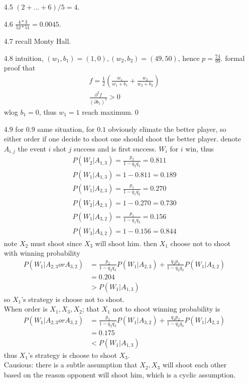 \documentclass[paper=a4, fontsize=11pt]{scrartcl} %
\numberwithin{equation}{section} %
\numberwithin{figure}{section} %
\numberwithin{table}{section} %
\begin{document}
\begin{itemize}
	\item[4.5] $(2+\dots+6)/5= 4$.
	\item[4.6] $\frac{4*3}{52*51}= 0.0045$.
	\item[4.7] recall Monty Hall.
	\item[4.8] intuition, $(w_1,b_1)=(1,0), (w_2,b_2)=(49,50)$, hence $p=\frac{74}{99}$. formal proof that
	\begin{align}
		f = \frac{1}{2}(\frac{w_1}{w_1+b_1} + \frac{w_2}{w_2+b_2})\\
		\frac{\partial^2 f}{(\partial b_1)^2}> 0
	\end{align}
	wlog $b_1=0$, thus $w_1=1$ reach maximum.\qed
	\item[4.9] for $0.9$ same situation, for $0.1$ obviously elimate the better player, so either order if one decide to shoot one should shoot the better player. denote $A_{i,j}$ the event $i$ shot $j$ success and is first success. $W_i$ for $i$ win, thus
	\begin{align}
		P(W_2| A_{1,3}) = \frac{p_2}{1-q_2q_1} = 0.811\\
		P(W_1| A_{1,3}) = 1 -0.811= 0.189\\
		P(W_1| A_{2,3}) = \frac{p_1}{1-q_1q_2} = 0.270\\
		P(W_2| A_{2,3}) = 1 - 0.270 = 0.730\\
		P(W_1| A_{3,2}) = \frac{p_1}{1-q_1q_3} = 0.156\\
		P(W_3| A_{3,2}) = 1 - 0.156 = 0.844
	\end{align}
	note $X_2$ must shoot since $X_3$ will shoot him. then $X_1$ choose not to shoot with winning probability
	\begin{align}
		P(W_1 | A_{2,3} or A_{3,2}) &= \frac{p_2}{1-q_2q_3} P(W_1|A_{2,3}) + \frac{q_2p_3}{1-q_2q_3} P(W_1|A_{3,2}) \\
			&= 0.204\\
			&> P(W_1| A_{1,3})
	\end{align}
	so $X_1$'s strategy is choose not to shoot.\\
	When order is $X_1,X_3,X_2$; that $X_1$ not to shoot winning probability is 
	\begin{align}
		P(W_1 | A_{2,3} or A_{3,2}) &= \frac{p_3}{1-q_2q_3}P(W_1|A_{3,2}) + \frac{q_3p_2}{1-q_2q_3} P(W_1|A_{2,3}) \\
			&= 0.175\\
			&< P(W_1| A_{1,3})
	\end{align}
	thus $X_1$'s strategy is choose to shoot $X_3$.\\
	Causious: there is a subtle assumption that $X_2,X_3$ will shoot each other based on the reason opponent will shoot him, which is a cyclic assumption.

\end{itemize}
\end{document}
